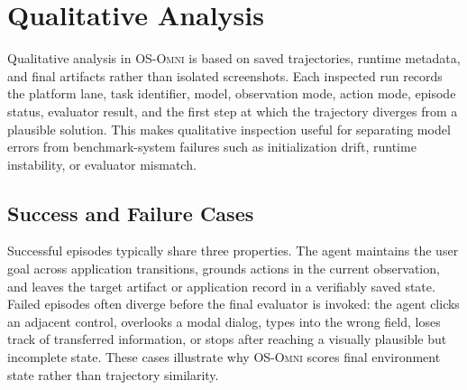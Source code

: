 \section{Qualitative Analysis}
\label{appendix:qualitative_analysis}
Qualitative analysis in \textsc{OS-Omni} is based on saved trajectories, runtime metadata, and final artifacts rather than isolated screenshots. Each inspected run records the platform lane, task identifier, model, observation mode, action mode, episode status, evaluator result, and the first step at which the trajectory diverges from a plausible solution. This makes qualitative inspection useful for separating model errors from benchmark-system failures such as initialization drift, runtime instability, or evaluator mismatch.

\subsection{Success and Failure Cases}
Successful episodes typically share three properties. The agent maintains the user goal across application transitions, grounds actions in the current observation, and leaves the target artifact or application record in a verifiably saved state. Failed episodes often diverge before the final evaluator is invoked: the agent clicks an adjacent control, overlooks a modal dialog, types into the wrong field, loses track of transferred information, or stops after reaching a visually plausible but incomplete state. These cases illustrate why \textsc{OS-Omni} scores final environment state rather than trajectory similarity.

